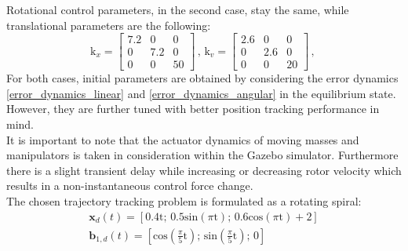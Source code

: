 \noindent Rotational control parameters, in the second case, stay the same, while translational parameters are the following: 
\begin{equation*}
	\text{k}_x = 
	\begin{bmatrix}
		7.2 &  0  &  0 \\
		0 & 7.2  &	0 \\ 
		0 &  0  & 50 	
	\end{bmatrix}
	\, , \,	
	\text{k}_v =
	\begin{bmatrix}
		2.6 & 0 & 0 \\
		0 & 2.6 & 0 \\
		0 & 0 & 20
	\end{bmatrix}
	\, , \,
\end{equation*}
For both cases, initial parameters are obtained by considering the error dynamics \eqref{error_dynamics_linear} and \eqref{error_dynamics_angular} in the equilibrium state. However, they are further tuned with better position tracking performance in mind.\\
It is important to note that the actuator dynamics of moving masses and manipulators is taken in consideration within the Gazebo simulator. Furthermore there is a slight transient delay while increasing or decreasing rotor velocity which results in a non-instantaneous control force change. \\
\indent The chosen trajectory tracking problem is formulated as a rotating spiral:
\begin{gather*}
	\textbf{x}_d(t) = [0.4\text{t}; \, 0.5\text{sin}(\pi\text{t}); \, 0.6\text{cos}(\pi\text{t}) + 2] \\
	\textbf{b}_{1,d}(t) = [\text{cos}\left(\frac{\pi}{5}\text{t}\right); \, \text{sin}\left(\frac{\pi}{5}\text{t}\right); \, 0]
\end{gather*}
